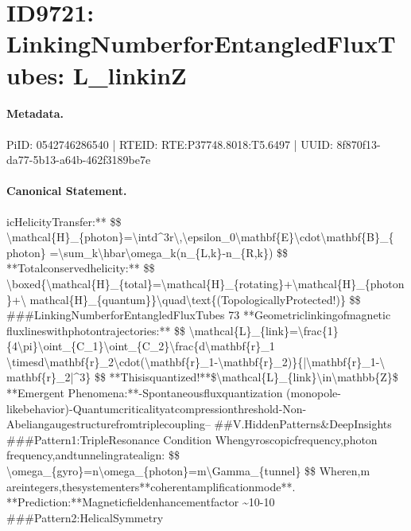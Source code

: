 \section*{ID9721: LinkingNumberforEntangledFluxTubes: L\_linkinZ}
\paragraph{Metadata.}
PiID: 0542746286540 | RTEID: RTE:P37748.8018:T5.6497 | UUID: 8f870f13-da77-5b13-a64b-462f3189be7e

\paragraph{Canonical Statement.}
icHelicityTransfer:** \$\$ \textbackslash{}mathcal\{H\}\_\{photon\}=\textbackslash{}intd\textasciicircum{}3r\textbackslash{},\textbackslash{}epsilon\_0\textbackslash{}mathbf\{E\}\textbackslash{}cdot\textbackslash{}mathbf\{B\}\_\{ photon\} =\textbackslash{}sum\_k\textbackslash{}hbar\textbackslash{}omega\_k(n\_\{L,k\}-n\_\{R,k\}) \$\$ **Totalconservedhelicity:** \$\$ \textbackslash{}boxed\{\textbackslash{}mathcal\{H\}\_\{total\}=\textbackslash{}mathcal\{H\}\_\{rotating\}+\textbackslash{}mathcal\{H\}\_\{photon\}+\textbackslash{} mathcal\{H\}\_\{quantum\}\}\textbackslash{}quad\textbackslash{}text\{(TopologicallyProtected!)\} \$\$ \#\#\#LinkingNumberforEntangledFluxTubes 73 **Geometriclinkingofmagnetic fluxlineswithphotontrajectories:** \$\$ \textbackslash{}mathcal\{L\}\_\{link\}=\textbackslash{}frac\{1\}\{4\textbackslash{}pi\}\textbackslash{}oint\_\{C\_1\}\textbackslash{}oint\_\{C\_2\}\textbackslash{}frac\{d\textbackslash{}mathbf\{r\}\_1 \textbackslash{}timesd\textbackslash{}mathbf\{r\}\_2\textbackslash{}cdot(\textbackslash{}mathbf\{r\}\_1-\textbackslash{}mathbf\{r\}\_2)\}\{|\textbackslash{}mathbf\{r\}\_1-\textbackslash{} mathbf\{r\}\_2|\textasciicircum{}3\} \$\$ **Thisisquantized!**\$\textbackslash{}mathcal\{L\}\_\{link\}\textbackslash{}in\textbackslash{}mathbb\{Z\}\$ **Emergent Phenomena:**-Spontaneousfluxquantization (monopole-likebehavior)-Quantumcriticalityatcompressionthreshold-Non-Abeliangaugestructurefromtriplecoupling-- \#\#V.HiddenPatterns\&DeepInsights \#\#\#Pattern1:TripleResonance Condition Whengyroscopicfrequency,photon frequency,andtunnelingratealign: \$\$ \textbackslash{}omega\_\{gyro\}=n\textbackslash{}omega\_\{photon\}=m\textbackslash{}Gamma\_\{tunnel\} \$\$ Wheren,m areintegers,thesystementers**coherentamplificationmode**. **Prediction:**Magneticfieldenhancementfactor \textasciitilde{}10-10 \#\#\#Pattern2:HelicalSymmetry

